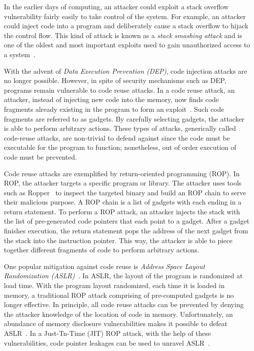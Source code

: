 
In the earlier days of computing, an attacker could exploit a stack overflow vulnerability fairly easily to take control of the system. For example, an attacker could inject code into a program and deliberately cause a stack overflow to hijack the control flow. This kind of attack is known as a \textit{stack smashing attack} and is one of the oldest and most important exploits used to gain unauthorized access to a system~\cite{pincus2004beyond, PhrackMa67:online}. 

With the advent of \textit{Data Execution Prevention (DEP)}, code injection attacks are no longer possible. However, in spite of security mechanisms such as DEP, programs remain vulnerable to code reuse attacks. In a code reuse attack, an attacker, instead of injecting new code into the memory, now finds code fragments already existing in the program to form an exploit~\cite{Shacham:2007:GIF:1315245.1315313}. Such code fragments are referred to as gadgets. By carefully selecting gadgets, the attacker is able to perform arbitrary actions. These types of attacks, generically called code-reuse attacks, are non-trivial to defend against since the code must be executable for the program to function; nonetheless, out of order execution of code must be prevented.

Code reuse attacks are exemplified by return-oriented programming (ROP). In ROP, the attacker targets a specific program or library. The attacker uses tools such as Ropper~\cite{schirra_2019} to inspect the targeted binary and build an ROP chain to serve their malicious purpose. A ROP chain is a list of gadgets with each ending in a return statement. To perform a ROP attack, an attacker injects the stack with the list of pre-generated code pointers that each point to a gadget. After a gadget finishes execution, the return statement pops the address of the next gadget from the stack into the instruction pointer. This way, the attacker is able to piece together different fragments of code to perform arbitrary actions.

One popular mitigation against code reuse is \textit{Address Space Layout Randomization (ASLR)}~\cite{ASLR,PAXASLR}.
In ASLR, the layout of the program is randomized at load time. With the program layout randomized, each time it is loaded in memory, a traditional ROP attack comprising of pre-computed gadgets is no longer effective. In principle, all code reuse attacks can be prevented by denying the attacker knowledge of the location of code in memory. Unfortunately, an abundance of memory disclosure vulnerabilities makes it possible to defeat ASLR~\cite{cvedetails:online,strackx2009breaking}. In a Just-Tn-Time (JIT) ROP attack, with the help of these vulnerabilities, code pointer leakages can be used to unravel ASLR~\cite{JITROP,ahmed2019methodologies}.


